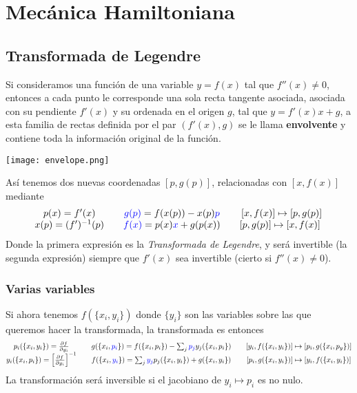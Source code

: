 \chapter{Mecánica Hamiltoniana} 
\section{Transformada de Legendre} 
Si consideramos una función de una variable $y=f(x)$ tal que $f''(x)\neq 0$, entonces a cada punto le corresponde una sola recta tangente asociada, asociada con su pendiente $f'(x)$ y su ordenada en el origen $g$, tal que $y = f'(x)x + g$, a esta familia de rectas definida por el par $(f'(x),g)$ se le llama \textbf{envolvente} y contiene toda la información original de la función.
\begin{marginfigure}[0cm]
	\texttt{[image: envelope.png]}
\end{marginfigure}
Así tenemos dos nuevas coordenadas $[p,g(p)]$, relacionadas con $[x,f(x)]$ mediante
\vspace{-15pt}
\begin{equation} \label{4.1.1}
    \begin{matrix}
        p(x)=f'(x) && \color{blue}g(p)\color{black}=f(x(p))-x(p)\color{blue}p\color{black} &&[x,f(x)] \mapsto [p,g(p)] \\
        x(p)=(f')^{-1}(p) &&  \color{blue}f(x) \color{black}=p(x)\color{blue}x\color{black}+g(p(x))  && [p,g(p)] \mapsto [x,f(x)]\
    \end{matrix}
\end{equation} 
Donde la primera expresión es la \textit{Transformada de Legendre}, y será invertible (la segunda expresión) siempre que $f'(x)$ sea invertible (cierto si $f''(x)\neq 0$).
\subsection{Varias variables}
Si ahora tenemos $f(\{x_i,y_i\})$ donde $\{y_i\}$ son las variables sobre las que queremos hacer la transformada, la transformada es entonces
\begin{equation} \label{4.1.2}
    \begin{matrix}
        p_i(\{x_i,y_i\})=\frac{\partial f}{\partial y_i} && g(\{x_i,\color{blue}p_i\color{black}\}) =f(\{x_i,p_i\}) -\sum_j \color{blue}p_j\color{black} y_j(\{x_i,p_i\})  &&[y_i,f(\{x_i,y_i\})] \mapsto [p_i,g(\{x_i,p_y\})] \\
        y_i(\{x_i,p_i\})=\left[\frac{\partial f}{\partial y_i}\right]^{-1} && f(\{x_i,\color{blue}y_i\color{black}\}) =\sum_j \color{blue}y_j\color{black} p_j (\{x_i,y_i\})  +g(\{x_i,y_i\}) &&[p_i,g(\{x_i,y_i\})] \mapsto [y_i,f(\{x_i,y_i\})]\\
    \end{matrix}
\end{equation} 
La transformación será inversible si el jacobiano de $y_i \mapsto p_i$ es no nulo.
